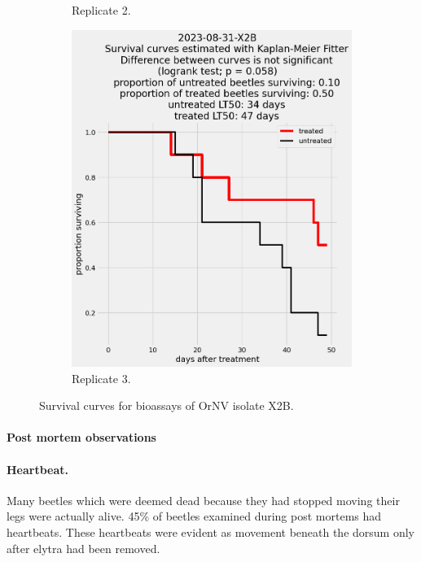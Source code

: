 \documentclass[12pt,letterpaper,english,bibliography=totocnumbered, abstract=on]{scrartcl}
\begin{document}
\begin{figure}[h]
\begin{subfigure}{.3\textwidth}
		\caption{Replicate 2.}
	\end{subfigure}
	\begin{subfigure}{.3\textwidth}
		\includegraphics[width=\textwidth]{images/survival_curves/2023-08-31-X2B}
		\caption{Replicate 3.}
	\end{subfigure}
	\caption{Survival curves for bioassays of OrNV isolate X2B.}
	\label{fig:X2B survival curves}
\end{figure}

\clearpage
\paragraph{Post mortem observations}

\paragraph{Heartbeat.} Many beetles which were deemed dead because they had stopped moving their legs were actually alive. 45\% of beetles examined during post mortems had heartbeats. These heartbeats were evident as movement beneath the dorsum only after elytra had been removed.  
\end{document}
